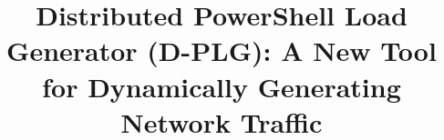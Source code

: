 \title{Distributed PowerShell Load Generator (D-PLG): A New Tool for
Dynamically Generating Network Traffic\footnotemark}
